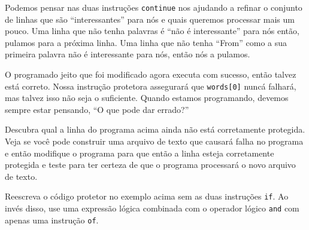 \begin{enumerate}

Podemos pensar nas duas instruções {\tt continue} nos ajudando a refinar
o conjunto de linhas que são ``interessantes'' para nós e quais queremos
processar mais um pouco. Uma linha que não tenha palavras é ``não é interessante''
 para nós então, pulamos para a próxima linha. Uma linha que não tenha ``From''
 como a sua primeira palavra não é interessante para nós, então nós a pulamos.


O programado jeito que foi modificado agora executa com sucesso, então talvez está correto.
Nossa instrução protetora assegurará que {\tt words[0]} nuncá falhará,
mas talvez isso não seja o suficiente. Quando estamos programando, devemos sempre estar pensando,
``O que pode dar errado?''


\begin{ex}
Descubra qual a linha do programa acima ainda não está corretamente protegida.
Veja se você pode construir uma arquivo de texto que causará falha no programa e
então modifique o programa para que então a linha esteja corretamente protegida e
teste para ter certeza de que o programa processará o novo arquivo de texto.
\end{ex}

\begin{ex}
Reescreva o código protetor no exemplo acima sem as duas instruções {\tt if}. Ao invés
disso, use uma expressão lógica combinada com o operador lógico {\tt and} com apenas uma
instrução {\tt of}.
\end{ex}

\end{enumerate}

